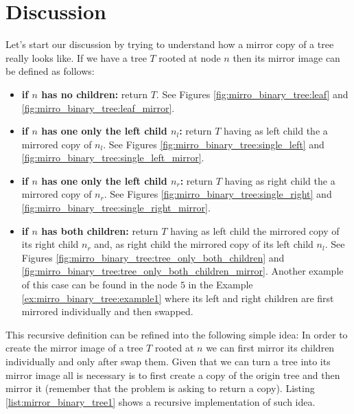 


\section{Discussion}
\label{mirror_binary_tree:sec:discussion}
Let's start our discussion by trying to understand how a mirror copy of a tree really looks like. If
we have a tree $T$ rooted at node $n$ then its mirror image  can be defined as
follows:
\begin{itemize}
	\item \textbf{if $n$ has no children:} return  $T$. See Figures \ref{fig:mirro_binary_tree:leaf}
	and \ref{fig:mirro_binary_tree:leaf_mirror}.
	\item \textbf{if $n$ has one only the left child $n_l$:}  return $T$ having as left child the a
	mirrored copy of $n_l$. See Figures \ref{fig:mirro_binary_tree:single_left} and
	\ref{fig:mirro_binary_tree:single_left_mirror}.
	\item \textbf{if $n$ has one only the left child $n_r$:}  return $T$ having as right child the a
	mirrored copy of $n_r$. See Figures \ref{fig:mirro_binary_tree:single_right} and
	\ref{fig:mirro_binary_tree:single_right_mirror}. 
	\item \textbf{if $n$ has both children:} return $T$ having as left child the mirrored copy of
	 its right child $n_r$ and, as right child the mirrored copy of its left child $n_l$.  See
	 Figures \ref{fig:mirro_binary_tree:tree_only_both_children} and
	 \ref{fig:mirro_binary_tree:tree_only_both_children_mirror}. Another example of this case can be
	 found in the node $5$ in the Example \ref{ex:mirro_binary_tree:example1} where its left and
	 right children are first mirrored individually and then swapped. 
\end{itemize}
This recursive definition can be refined into the following simple idea: In order to create the
mirror image of a tree $T$ rooted at $n$ we can first mirror its children individually and only
after swap them. Given that we can turn a tree into its mirror image all is  necessary is to first create a copy of the origin tree
and then mirror it (remember that the problem is asking to return a copy). 
Listing \ref{list:mirror_binary_tree1} shows a recursive implementation of such
idea.


